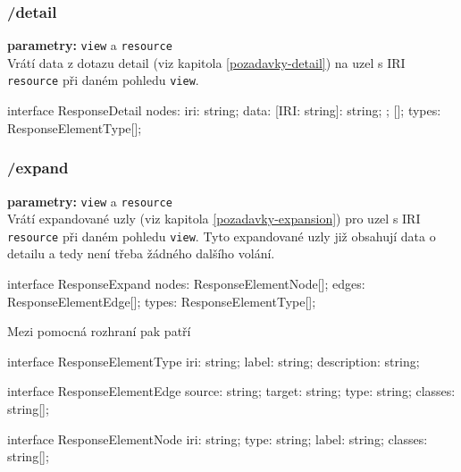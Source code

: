 \subsubsection{/detail}
\textbf{parametry:} \texttt{view} a \texttt{resource} \\
Vrátí data z dotazu detail (viz kapitola \ref{pozadavky-detail}) na uzel s IRI \texttt{resource} při daném pohledu \texttt{view}.

\begin{code}
interface ResponseDetail {
    nodes: {
        iri: string;
        data: {
            [IRI: string]: string;
        };
    }[];
    types: ResponseElementType[];
}
\end{code}

\subsubsection{/expand}
\textbf{parametry:} \texttt{view} a \texttt{resource} \\
Vrátí expandované uzly (viz kapitola \ref{pozadavky-expansion}) pro uzel s IRI \texttt{resource} při daném pohledu \texttt{view}. Tyto expandované uzly již obsahují data o detailu a tedy není třeba žádného dalšího volání.

\begin{code}
interface ResponseExpand {
    nodes: ResponseElementNode[];
    edges: ResponseElementEdge[];
    types: ResponseElementType[];
}
\end{code}

\newpage

Mezi pomocná rozhraní pak patří
\begin{code}
interface ResponseElementType {
    iri: string;
    label: string;
    description: string;
}

interface ResponseElementEdge {
    source: string;
    target: string;
    type: string;
    classes: string[];
}

interface ResponseElementNode {
    iri: string;
    type: string;
    label: string;
    classes: string[];
}
\end{code}

